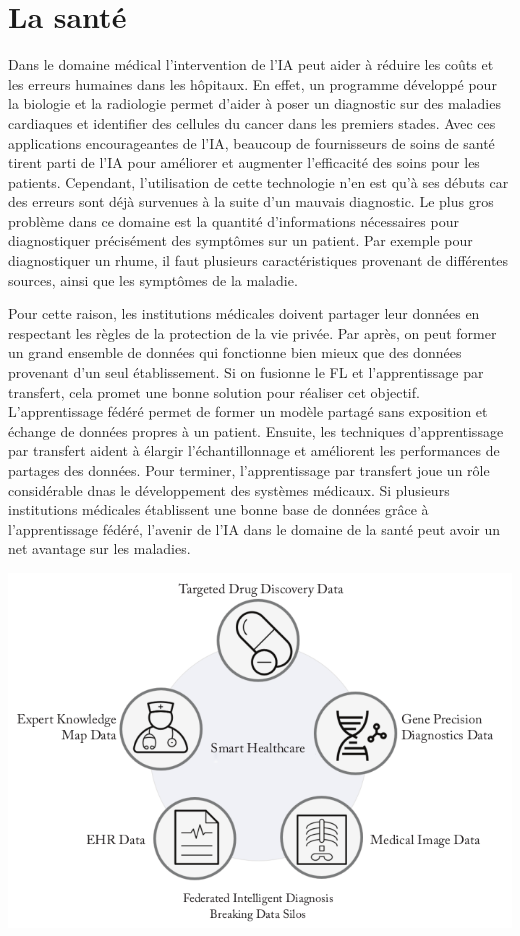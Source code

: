 \documentclass[12pt,a4paper,french]{report}
\begin{document}
\section{La santé}

Dans le domaine médical l'intervention de l'IA peut aider à réduire les coûts et les erreurs humaines dans les hôpitaux. En effet, un programme développé pour la biologie et la radiologie permet d'aider à poser un diagnostic sur des maladies cardiaques et identifier des cellules du cancer dans les premiers stades. Avec ces applications encourageantes de l'IA, beaucoup de fournisseurs de soins de santé tirent parti de l'IA pour améliorer et augmenter l'efficacité des soins pour les patients. Cependant, l'utilisation de cette technologie n'en est qu'à ses débuts car des erreurs sont déjà survenues à la suite d'un mauvais diagnostic. Le plus gros problème dans ce domaine est la quantité d'informations nécessaires pour diagnostiquer précisément des symptômes sur un patient. Par exemple pour diagnostiquer un rhume, il faut plusieurs caractéristiques provenant de différentes sources, ainsi que les symptômes de la maladie.

Pour cette raison, les institutions médicales doivent partager leur données en respectant les règles de la protection de la vie privée. Par après, on peut former un grand ensemble de données qui fonctionne bien mieux que des données provenant d'un seul établissement. Si on fusionne le FL et l'apprentissage par transfert, cela promet une bonne solution pour réaliser cet objectif. L'apprentissage fédéré permet de former un modèle partagé sans exposition et échange de données propres à un patient. Ensuite, les techniques d'apprentissage par transfert aident à élargir l'échantillonnage et améliorent les performances de partages des données. Pour terminer, l'apprentissage par transfert joue un rôle considérable dnas le développement des systèmes médicaux. Si plusieurs institutions médicales établissent une bonne base de données grâce à l'apprentissage fédéré, l'avenir de l'IA dans le domaine de la santé peut avoir un net avantage sur les maladies. 

\begin{center}
	\includegraphics[scale=0.5]{medic}
	\label{fig1}
\end{center}
\end{document}
